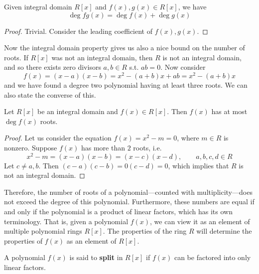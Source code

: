   \begin{lemma}
    Given integral domain $R[x]$ and $f(x), g(x) \in R[x]$, we have 
    \begin{equation}
      \deg{fg(x)} = \deg{f(x)} + \deg{g(x)}
    \end{equation}
  \end{lemma}
  \begin{proof}
    Trivial. Consider the leading coefficient of $f(x), g(x)$. 
  \end{proof}

  Now the integral domain property gives us also a nice bound on the number of roots. If $R[x]$ was not an integral domain, then $R$ is not an integral domain, and so there exists zero divisors $a, b \in R$ s.t. $ab = 0$. Now consider 
  \begin{equation}
    f(x) = (x - a) (x - b) = x^2 - (a + b) x + ab = x^2 - (a + b) x
  \end{equation}
  and we have found a degree two polynomial having at least three roots. We can also state the converse of this. 

  \begin{theorem}
    Let $R[x]$ be an integral domain and $f(x) \in R[x]$. Then $f(x)$ has at most $\deg{f(x)}$ roots. 
  \end{theorem}
  \begin{proof}
    Let us consider the equation $f(x) = x^2 - m = 0$, where $m \in R$ is nonzero. Suppose $f(x)$ has more than $2$ roots, i.e. 
    \begin{equation}
      x^2 - m = (x - a)(x - b) = (x - c) (x - d), \qquad a, b, c, d \in R
    \end{equation}
    Let $c \neq a, b$. Then $(c - a)(c - b) = 0 (c - d) = 0$, which implies that $R$ is not an integral domain. 
  \end{proof}

  Therefore, the number of roots of a polynomial---counted with multiplicity---does not exceed the degree of this polynomial. Furthermore, these numbers are equal if and only if the polynomial is a product of linear factors, which has its own terminology. That is, given a polynomial $f(x)$, we can view it as an element of multiple polynomial rings $R[x]$. The properties of the ring $R$ will determine the properties of $f(x)$ as an element of $R[x]$. 

  \begin{theorem}
    A polynomial $f(x)$ is said to \textbf{split} in $R[x]$ if $f(x)$ can be factored into only linear factors. 
  \end{theorem}

